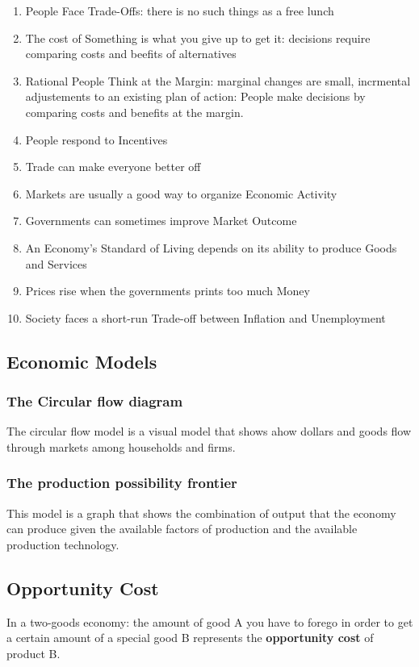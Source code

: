 \documentclass[a4paper,titlepage] {scrartcl}
\begin{document}
\begin{enumerate}
	\item People Face Trade-Offs: there is no such things as a free lunch
	\item The cost of Something is what you give up to get it: decisions require comparing costs and beefits of alternatives
	\item Rational People Think at the Margin: marginal changes are small, incrmental adjustements to an existing plan of action: People make decisions by comparing 
	costs and benefits at the margin.
	\item People respond to Incentives
	\item Trade can make everyone better off
	\item Markets are usually a good way to organize Economic Activity
	\item Governments can sometimes improve Market Outcome
	\item An Economy's Standard of Living depends on its ability to produce Goods and Services
	\item Prices rise when the governments prints too much Money
	\item Society faces a short-run Trade-off between Inflation and Unemployment
\end{enumerate}

\subsection{Economic Models}
\subsubsection{The Circular flow diagram}
The circular flow model is a visual model that shows ahow dollars and goods flow through markets among households and firms.
\subsubsection{The production possibility frontier}
This model is a graph that shows the combination of output that the economy can produce given the available factors of production and the available production technology.

\subsection{Opportunity Cost}
In a two-goods economy: the amount of good A you have to forego in order to get a certain amount of a special good B represents the \textbf{opportunity cost} of product B.
\end{document}
